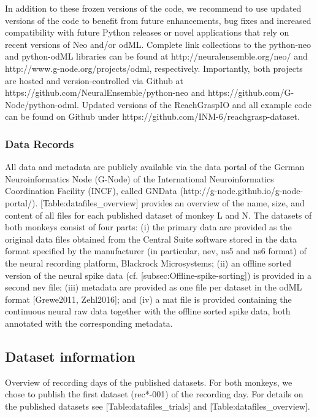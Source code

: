 {In addition to these frozen versions of the code, we recommend to use updated versions of the code to benefit from future enhancements, bug fixes and increased compatibility with future Python releases or novel applications that rely on recent versions of Neo and/or odML. Complete link collections to the python-neo and python-odML libraries can be found at http://neuralensemble.org/neo/ and http://www.g-node.org/projects/odml, respectively. Importantly, both projects are hosted and version-controlled via Github at https://github.com/NeuralEnsemble/python-neo and https://github.com/G-Node/python-odml. Updated versions of the ReachGraspIO and all example code can be found on Github under https://github.com/INM-6/reachgrasp-dataset.

\subsubsection{Data Records}

All data and metadata are publicly available via the data portal of the German Neuroinformatics Node (G-Node) of the International Neuroinformatics Coordination Facility (INCF), called GNData (http://g-node.github.io/g-node-portal/). [Table:datafiles\_overview] provides an overview of the name, size, and content of all files for each published dataset of monkey L and N. The datasets of both monkeys consist of four parts: (i) the primary data are provided as the original data files obtained from the Central Suite software stored in the data format specified by the manufacturer (in particular, nev, ns5 and ns6 format) of the neural recording platform, Blackrock Microsystems; (ii) an offline sorted version of the neural spike data (cf. [subsec:Offline-spike-sorting]) is provided in a second nev file; (iii) metadata are provided as one file per dataset in the odML format [Grewe2011, Zehl2016]; and (iv) a mat file is provided containing the continuous neural raw data together with the offline sorted spike data, both annotated with the corresponding metadata.



\subsection{Dataset information}

Overview of recording days of the published datasets. For both monkeys, we chose to publish the first dataset (rec*-001) of the recording day. For details on the published datasets see [Table:datafiles\_trials] and [Table:datafiles\_overview].

}
